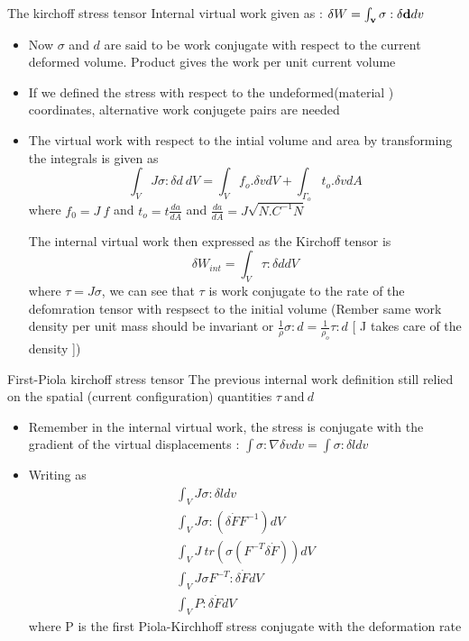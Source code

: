 	\begin{frame}{The kirchoff stress tensor}
		Internal virtual work given as : 
		$\delta W = \mathbf{\int_{v} \sigma : \delta d} dv$
		\begin{itemize}
			\item  Now $\sigma$ and $d$ are said to be work conjugate with respect to the current deformed volume. Product gives the work per unit current volume
			\item If we defined the stress with respect to the undeformed(material ) coordinates, alternative work conjugete pairs are needed
			\item The virtual work with respect to the intial volume and area by transforming the integrals is given as 
			\begin{equation}
			 \int_V J \sigma:\delta d~ dV = \int_V f_o. \delta v dV + \int_{\Gamma_o} t_o. \delta v dA
			\end{equation}
			where $f_0 = J~f$ and $t_o = t\frac{da}{dA}$ and  $\frac{da}{dA} = J \sqrt{N.C^{-1}N}$
			
			\begin{block}{}
				The internal virtual work then expressed as the Kirchoff tensor  is
				\begin{equation}
				\delta W_{int} = \int_{V} \tau: \delta d dV
				\end{equation}
				where $\tau = J \sigma$, we can see that $\tau$ is work conjugate to the rate of the defomration tensor with respsect to the initial volume (Rember same work density per unit mass should be invariant or $\frac{1}{\rho} \sigma:d = \frac{1}{\rho_o}\tau:d$ [ J takes care of the density ])
			\end{block}
		\end{itemize}
	\end{frame}


	\begin{frame}{First-Piola kirchoff stress tensor}
		The previous internal work definition still relied on the spatial (current configuration) quantities $\tau~ \text{and}~ d$ 
		\begin{itemize}
		\item 	Remember in the internal virtual work, the stress is conjugate with the gradient of the virtual displacements : $\int \sigma : \nabla \delta v dv = \int \sigma : \delta l dv$		
		\item  Writing as 
		\begin{equation}
		\begin{aligned}
		\int_V J \sigma :\delta l dv \\
		\int_V J \sigma :(\delta \dot{F} F^{-1}) dV\\
		\int_V J ~tr(\sigma (F^{-T}\delta \dot{F})) dV \\
		\int_V J \sigma F^{-T}: \delta \dot{F} dV\\
		\int_V P: \delta \dot{F} dV
		\end{aligned}
		\end{equation}
		where P is the first Piola-Kirchhoff stress conjugate with the deformation rate
		\end{itemize}

	\end{frame}

